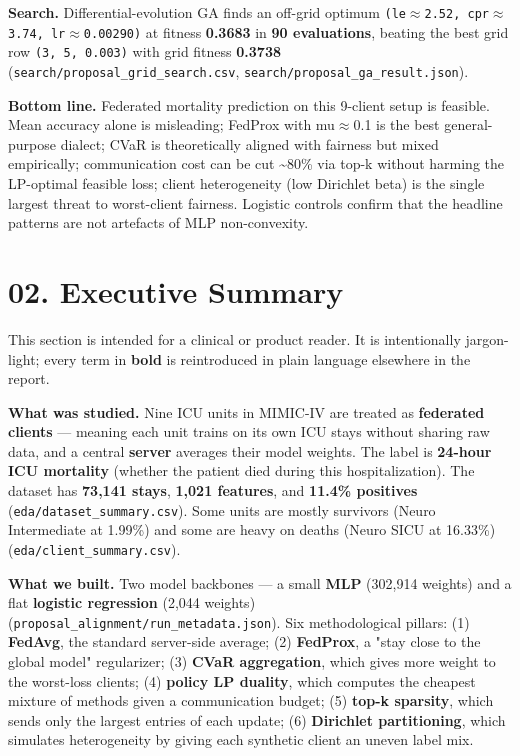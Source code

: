 \documentclass{article}
\begin{document}
\textbf{Search.} Differential-evolution GA finds an off-grid optimum \texttt{(le\ensuremath{\approx}2.52, cpr\ensuremath{\approx}3.74, lr\ensuremath{\approx}0.00290)} at fitness \textbf{0.3683} in \textbf{90 evaluations}, beating the best grid row \texttt{(3, 5, 0.003)} with grid fitness \textbf{0.3738} (\texttt{search/proposal\_grid\_search.csv}, \texttt{search/proposal\_ga\_result.json}).


\textbf{Bottom line.} Federated mortality prediction on this 9-client setup is feasible. Mean accuracy alone is misleading; FedProx with mu\ensuremath{\approx}0.1 is the best general-purpose dialect; CVaR is theoretically aligned with fairness but mixed empirically; communication cost can be cut \textasciitilde{}80\% via top-k without harming the LP-optimal feasible loss; client heterogeneity (low Dirichlet beta) is the single largest threat to worst-client fairness. Logistic controls confirm that the headline patterns are not artefacts of MLP non-convexity.



\clearpage
\section{02. Executive Summary}


This section is intended for a clinical or product reader. It is intentionally jargon-light; every term in \textbf{bold} is reintroduced in plain language elsewhere in the report.


\textbf{What was studied.} Nine ICU units in MIMIC-IV are treated as \textbf{federated clients} --- meaning each unit trains on its own ICU stays without sharing raw data, and a central \textbf{server} averages their model weights. The label is \textbf{24-hour ICU mortality} (whether the patient died during this hospitalization). The dataset has \textbf{73,141 stays}, \textbf{1,021 features}, and \textbf{11.4\% positives} (\texttt{eda/dataset\_summary.csv}). Some units are mostly survivors (Neuro Intermediate at 1.99\%) and some are heavy on deaths (Neuro SICU at 16.33\%) (\texttt{eda/client\_summary.csv}).


\textbf{What we built.} Two model backbones --- a small \textbf{MLP} (302,914 weights) and a flat \textbf{logistic regression} (2,044 weights) (\texttt{proposal\_alignment/run\_metadata.json}). Six methodological pillars: (1) \textbf{FedAvg}, the standard server-side average; (2) \textbf{FedProx}, a "stay close to the global model" regularizer; (3) \textbf{CVaR aggregation}, which gives more weight to the worst-loss clients; (4) \textbf{policy LP duality}, which computes the cheapest mixture of methods given a communication budget; (5) \textbf{top-k sparsity}, which sends only the largest entries of each update; (6) \textbf{Dirichlet partitioning}, which simulates heterogeneity by giving each synthetic client an uneven label mix.
\end{document}
